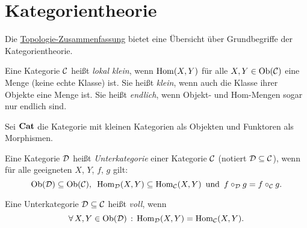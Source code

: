 \documentclass{cheat-sheet}
\begin{document}




\section{Kategorientheorie}

\begin{bem}
  Die \href{http://timbaumann.info/uni-spicker/topo.pdf}{Topologie-Zusammenfassung} bietet eine Übersicht über Grundbegriffe der Kategorientheorie.
\end{bem}

\begin{defn}
  Eine Kategorie $\mathcal{C}$ heißt \emph{lokal klein}, wenn $\operatorname{Hom}(X, Y)$ für alle $X, Y \in \operatorname{Ob}(\mathcal{C})$ eine Menge (keine echte Klasse) ist.
  Sie heißt \emph{klein}, wenn auch die Klasse ihrer Objekte eine Menge ist.
  Sie heißt \emph{endlich}, wenn Objekt- und Hom-Mengen sogar nur endlich sind.
\end{defn}

\begin{defn}
  Sei $\mathbf{Cat}$ die Kategorie mit kleinen Kategorien als Objekten und Funktoren als Morphismen.
\end{defn}



\begin{defn}
  Eine Kategorie $\mathcal{D}$ heißt \emph{Unterkategorie} einer Kategorie $\mathcal{C}$ (notiert $\mathcal{D} \subseteq \mathcal{C}$), wenn für alle geeigneten $X$, $Y$, $f$, $g$ gilt:
  \[
    \operatorname{Ob}(\mathcal{D}) \subseteq \operatorname{Ob}(\mathcal{C}), \enspace
    \operatorname{Hom}_{\mathcal{D}}(X, Y) \subseteq \operatorname{Hom}_{\mathcal{C}}(X, Y) \enspace \text{und} \enspace
    f \circ_{\mathcal{D}} g = f \circ_{\mathcal{C}} g.
  \]
\end{defn}

\begin{defn}
  Eine Unterkategorie $\mathcal{D} \subseteq \mathcal{C}$ heißt \emph{voll}, wenn
  \[ \forall \, {X, Y \in \operatorname{Ob}(\mathcal{D})} \,:\, \operatorname{Hom}_{\mathcal{D}}(X, Y) = \operatorname{Hom}_{\mathcal{C}}(X, Y). \]
\end{defn}
\end{document}
